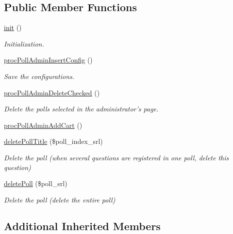 \subsection*{Public Member Functions}
\begin{DoxyCompactItemize}
\item 
\hyperlink{classpollAdminController_adaf2c123a1f123bcb92de4f373ead8a9}{init} ()
\begin{DoxyCompactList}\small\item\em Initialization. \end{DoxyCompactList}\item 
\hyperlink{classpollAdminController_ab34f3cb8a5b40217ed0acdaaa11ee0ad}{proc\+Poll\+Admin\+Insert\+Config} ()
\begin{DoxyCompactList}\small\item\em Save the configurations. \end{DoxyCompactList}\item 
\hyperlink{classpollAdminController_af1a9c9f33253af68ac12e4c026bd699a}{proc\+Poll\+Admin\+Delete\+Checked} ()
\begin{DoxyCompactList}\small\item\em Delete the polls selected in the administrator's page. \end{DoxyCompactList}\item 
\hyperlink{classpollAdminController_a148e3ec22f5a872647e7208bb853d3a1}{proc\+Poll\+Admin\+Add\+Cart} ()
\item 
\hyperlink{classpollAdminController_acd355746ff4a145b974b2a95b9c0eda9}{delete\+Poll\+Title} (\$poll\+\_\+index\+\_\+srl)
\begin{DoxyCompactList}\small\item\em Delete the poll (when several questions are registered in one poll, delete this question) \end{DoxyCompactList}\item 
\hyperlink{classpollAdminController_ab8fa4ab256e902120f27dac1edea8f57}{delete\+Poll} (\$poll\+\_\+srl)
\begin{DoxyCompactList}\small\item\em Delete the poll (delete the entire poll) \end{DoxyCompactList}\end{DoxyCompactItemize}
\subsection*{Additional Inherited Members}


